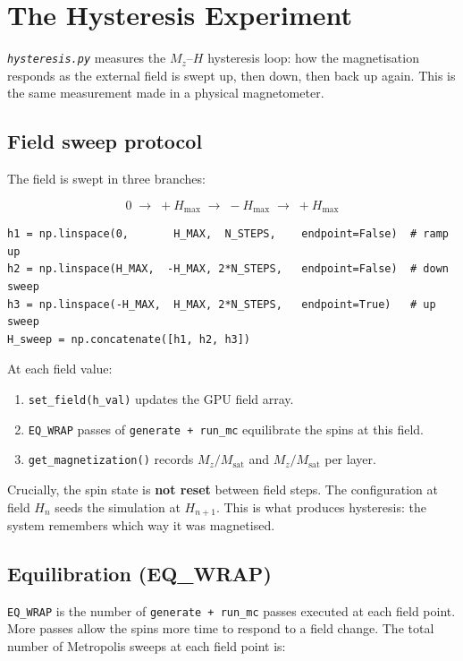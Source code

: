 \documentclass[12pt,a4paper]{article}
\newcommand{\code}[1]{\texttt{#1}}
\newcommand{\file}[1]{\texttt{\textit{#1}}}
\newcommand{\param}[1]{\texttt{#1}}
\begin{document}
\section{The Hysteresis Experiment}
\label{sec:hysteresis}

\file{hysteresis.py} measures the $M_z$--$H$ hysteresis loop: how the
magnetisation responds as the external field is swept up, then down, then back
up again. This is the same measurement made in a physical magnetometer.

\subsection{Field sweep protocol}

The field is swept in three branches:

\[
0 \;\to\; +H_\text{max} \;\to\; -H_\text{max} \;\to\; +H_\text{max}
\]

\begin{lstlisting}[style=python]
h1 = np.linspace(0,       H_MAX,  N_STEPS,    endpoint=False)  # ramp up
h2 = np.linspace(H_MAX,  -H_MAX, 2*N_STEPS,   endpoint=False)  # down sweep
h3 = np.linspace(-H_MAX,  H_MAX, 2*N_STEPS,   endpoint=True)   # up sweep
H_sweep = np.concatenate([h1, h2, h3])
\end{lstlisting}

At each field value:
\begin{enumerate}
  \item \code{set\_field(h\_val)} updates the GPU field array.
  \item \code{EQ\_WRAP} passes of \code{generate + run\_mc} equilibrate the
        spins at this field.
  \item \code{get\_magnetization()} records $M_z / M_\text{sat}$ and
        $M_z / M_\text{sat}$ per layer.
\end{enumerate}

Crucially, the spin state is \textbf{not reset} between field steps. The
configuration at field $H_n$ seeds the simulation at $H_{n+1}$. This is what
produces hysteresis: the system remembers which way it was magnetised.

\subsection{Equilibration (EQ\_WRAP)}

\param{EQ\_WRAP} is the number of \code{generate + run\_mc} passes executed at
each field point. More passes allow the spins more time to respond to a field
change. The total number of Metropolis sweeps at each field point is:
\end{document}
